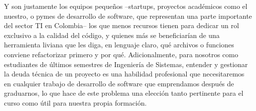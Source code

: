 Y son justamente los equipos pequeños --startups, proyectos académicos como el nuestro, o pymes de desarrollo de software, que representan una parte importante del sector TI en Colombia-- los que menos recursos tienen para dedicar un rol exclusivo a la calidad del código, y quienes más se beneficiarían de una herramienta liviana que les diga, en lenguaje claro, qué archivos o funciones conviene refactorizar primero y por qué. Adicionalmente, para nosotros como estudiantes de últimos semestres de Ingeniería de Sistemas, entender y gestionar la deuda técnica de un proyecto es una habilidad profesional que necesitaremos en cualquier trabajo de desarrollo de software que emprendamos después de graduarnos, lo que hace de este problema una elección tanto pertinente para el curso como útil para nuestra propia formación.

\pagebreak
